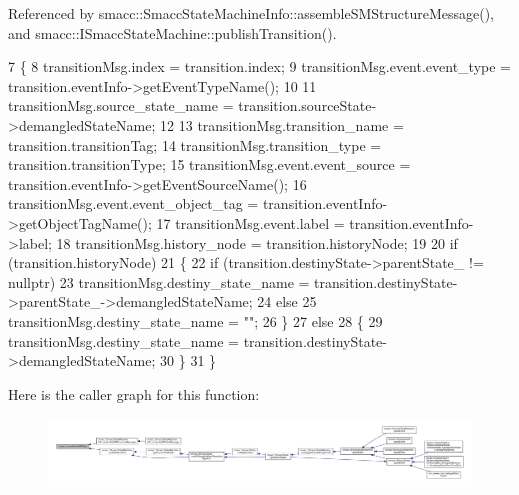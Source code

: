 Referenced by smacc\+::\+Smacc\+State\+Machine\+Info\+::assemble\+S\+M\+Structure\+Message(), and smacc\+::\+I\+Smacc\+State\+Machine\+::publish\+Transition().


\begin{DoxyCode}
7 \{
8     transitionMsg.index = transition.index;
9     transitionMsg.event.event\_type = transition.eventInfo->getEventTypeName();
10 
11     transitionMsg.source\_state\_name = transition.sourceState->demangledStateName;
12     
13     transitionMsg.transition\_name = transition.transitionTag;
14     transitionMsg.transition\_type = transition.transitionType;
15     transitionMsg.event.event\_source = transition.eventInfo->getEventSourceName();
16     transitionMsg.event.event\_object\_tag = transition.eventInfo->getObjectTagName();
17     transitionMsg.event.label = transition.eventInfo->label;
18     transitionMsg.history\_node = transition.historyNode;
19 
20     \textcolor{keywordflow}{if} (transition.historyNode)
21     \{
22         \textcolor{keywordflow}{if} (transition.destinyState->parentState\_ != \textcolor{keyword}{nullptr})
23             transitionMsg.destiny\_state\_name = transition.destinyState->parentState\_->demangledStateName;
24         \textcolor{keywordflow}{else}
25             transitionMsg.destiny\_state\_name = \textcolor{stringliteral}{""};
26     \}
27     \textcolor{keywordflow}{else}
28     \{
29         transitionMsg.destiny\_state\_name = transition.destinyState->demangledStateName;
30     \}
31 \}
\end{DoxyCode}


Here is the caller graph for this function\+:
\nopagebreak
\begin{figure}[H]
\begin{center}
\leavevmode
\includegraphics[width=350pt]{namespacesmacc_a6cda75a51f4a5e29d0a64effb800fb61_icgraph}
\end{center}
\end{figure}


